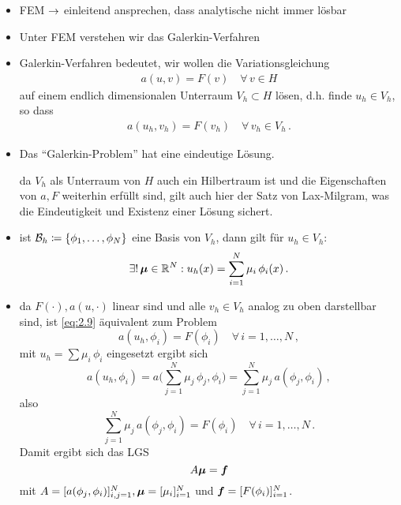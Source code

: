 \begin{itemize}
\item FEM $\rightarrow$ einleitend ansprechen, dass analytische nicht immer lösbar

\item Unter FEM verstehen wir das Galerkin-Verfahren

\item Galerkin-Verfahren bedeutet, wir wollen die Variationsgleichung
\begin{align}\label{eq:2.8}
	a(u,v) = F(v) \quad \forall \, v \in H
\end{align}
auf einem endlich dimensionalen Unterraum $V_h \subset H$ lösen, d.h. finde $u_h \in V_h$, so dass
\begin{align}\label{eq:2.9}
	a(u_h,v_h) = F(v_h) \quad \forall \, v_h \in V_h \, .
\end{align}
\item \begin{satz}
Das "`Galerkin-Problem"' hat eine eindeutige Lösung.
\end{satz}

da $V_h$ als Unterraum von $H$ auch ein Hilbertraum ist und die Eigenschaften von $a, F$ weiterhin erfüllt sind, gilt auch hier der Satz von Lax-Milgram, was die Eindeutigkeit und Existenz einer Lösung sichert.

\item ist $\mathcal B_h \coloneqq \{\phi_1,\ldots,\phi_N\}$ eine Basis von $V_h$, dann gilt für $u_h \in V_h$:
\begin{align}\label{eq:2.10}
	\exists! \, \boldsymbol\mu \in \mathbb{R}^N :  u_h(x) = \sum_{i = 1}^N \mu_i \,  \phi_i(x) \, .
\end{align}

\item da $F(\cdot),a(u,\cdot)$ linear sind und alle $v_h \in V_h$ analog zu oben darstellbar sind, ist \eqref{eq:2.9} äquivalent zum Problem
\[
	a(u_h,\phi_i) = F(\phi_i) \quad \forall \, i = 1, \ldots,N \, ,
\]
mit $u_h = \sum \mu_i \, \phi_i$ eingesetzt ergibt sich
\[
	a(u_h,\phi_i) = a \Big( \sum_{j = 1}^N \mu_j \,  \phi_j,\phi_i \Big) = \sum_{j = 1}^N \mu_j \, a(\phi_j,\phi_i) \, ,
\]
also
\[
	 \sum_{j = 1}^N \mu_j \, a(\phi_j,\phi_i) = F(\phi_i)\quad \forall \, i = 1, \ldots,N \, .
\]
Damit ergibt sich das LGS
\[
	A \boldsymbol \mu = \boldsymbol f 
\]
mit $A = [a(\phi_j,\phi_i)]_{i,j=1}^N, \boldsymbol \mu = [\mu_i]_{i=1}^N$ und $\boldsymbol f = [F(\phi_i)]_{i=1}^N$.


\end{itemize}
